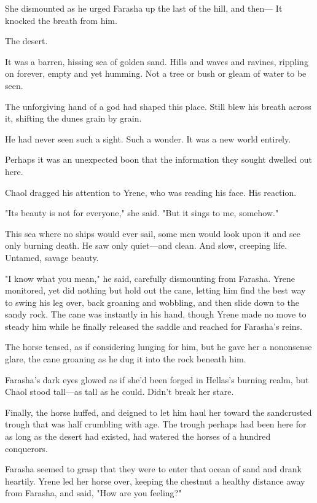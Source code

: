 She dismounted as he urged Farasha up the last of the hill, and then--- It knocked the breath from him.

The desert.

It was a barren, hissing sea of golden sand.
Hills and waves and ravines, rippling on forever, empty and yet humming.
Not a tree or bush or gleam of water to be seen.

The unforgiving hand of a god had shaped this place.
Still blew his breath across it, shifting the dunes grain by grain.

He had never seen such a sight.
Such a wonder.
It was a new world entirely.

Perhaps it was an unexpected boon that the information they sought dwelled out here.

Chaol dragged his attention to Yrene, who was reading his face.
His reaction.

"Its beauty is not for everyone," she said.
"But it sings to me, somehow."

This sea where no ships would ever sail, some men would look upon it and see only burning death.
He saw only quiet---and clean.
And slow, creeping life.
Untamed, savage beauty.

"I know what you mean," he said, carefully dismounting from Farasha.
Yrene monitored, yet did nothing but hold out the cane, letting him find the best way to swing his leg over, back groaning and wobbling, and then slide down to the sandy rock.
The cane was instantly in his hand, though Yrene made no move to steady him while he finally released the saddle and reached for Farasha's reins.

The horse tensed, as if considering lunging for him, but he gave her a nononsense glare, the cane groaning as he dug it into the rock beneath him.

Farasha's dark eyes glowed as if she'd been forged in Hellas's burning realm, but Chaol stood tall---as tall as he could.
Didn't break her stare.

Finally, the horse huffed, and deigned to let him haul her toward the sandcrusted trough that was half crumbling with age.
The trough perhaps had been here for as long as the desert had existed, had watered the horses of a hundred conquerors.

Farasha seemed to grasp that they were to enter that ocean of sand and drank heartily.
Yrene led her horse over, keeping the chestnut a healthy distance away from Farasha, and said, "How are you feeling?"

